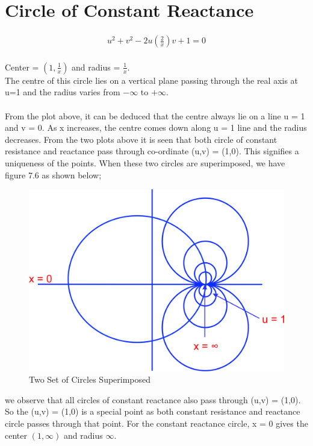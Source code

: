 \section{Circle of Constant Reactance}
\begin{align*}
u^2+v^2-2u\left(\frac{2}{x}\right)v+1=0
\end{align*}\\
Center = $(1,\frac{1}{x})$ and radius = $\frac{1}{x}$. \\
The centre of this circle lies on a vertical plane passing through the real axis at u=1 and the radius varies from $-\infty$ to $+\infty$.\\\\
From the plot above, it can be deduced that the centre always lie on a line u = 1 and v = 0. As x increases, the centre comes down along u = 1 line and the radius decreases.  
From the two plots above it is seen that both circle of constant resistance and reactance pass through co-ordinate (u,v) = (1,0). This signifies a uniqueness of the points.  When these two circles are superimposed, we have figure 7.6 as shown below;
\begin{figure}[h]
\centering
\includegraphics[width=0.5\linewidth]{./graphics/uytrdbn}
\caption{Two Set of Circles Superimposed}
\label{fig:uytrdbn}
\end{figure}

we observe that all circles of constant reactance also pass through (u,v) = (1,0). So the (u,v) = (1,0) is a special point as both constant resistance and reactance circle passes through that point. For the constant reactance circle, x = 0 gives the center $(1,\infty)$ and radius $\infty$. 

